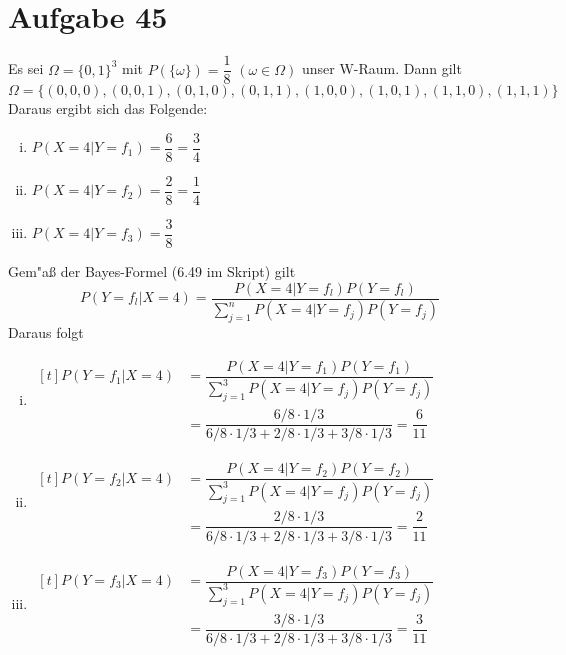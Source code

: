 \section{Aufgabe 45}

Es sei $\Omega = \{0, 1\}^3$ mit $P(\{\omega\}) = \dfrac{1}{8}$ $(\omega \in \Omega)$ unser W-Raum. Dann gilt
\begin{equation*}
    \Omega = \{(0, 0, 0), (0, 0, 1), (0, 1, 0), (0, 1, 1), (1, 0, 0), (1, 0, 1), (1, 1, 0), (1, 1, 1)\}
\end{equation*}
Daraus ergibt sich das Folgende:
\begin{enumerate}[i)]
    \item $P(X = 4 | Y = f_1) = \dfrac{6}{8} = \dfrac{3}{4}$
    \item $P(X = 4 | Y = f_2) = \dfrac{2}{8} = \dfrac{1}{4}$
    \item $P(X = 4 | Y = f_3) = \dfrac{3}{8}$
\end{enumerate}
Gem"a{\ss} der Bayes-Formel (6.49 im Skript) gilt
\begin{equation*}
    P(Y = f_l | X = 4) = \dfrac{P(X = 4 | Y = f_l)P(Y = f_l)}{\sum_{j = 1}^nP(X = 4 | Y = f_j)P(Y = f_j)}
\end{equation*}
Daraus folgt
\begin{enumerate}[i)]
    \item $\begin{aligned}[t]
            P(Y = f_1 | X = 4) &= \dfrac{P(X = 4 | Y = f_1)P(Y = f_1)}{\sum_{j = 1}^3P(X = 4 | Y = f_j)P(Y = f_j)}  \\[5pt]
                               &= \dfrac{6/8 \cdot 1/3}{6/8 \cdot 1/3 + 2/8 \cdot 1/3 + 3/8 \cdot 1/3} = \dfrac{6}{11}
        \end{aligned}$ \\[5pt]
    \item $\begin{aligned}[t]
            P(Y = f_2 | X = 4) &= \dfrac{P(X = 4 | Y = f_2)P(Y = f_2)}{\sum_{j = 1}^3P(X = 4 | Y = f_j)P(Y = f_j)}  \\[5pt]
                               &= \dfrac{2/8 \cdot 1/3}{6/8 \cdot 1/3 + 2/8 \cdot 1/3 + 3/8 \cdot 1/3} = \dfrac{2}{11}
        \end{aligned}$ \\[5pt]
    \item $\begin{aligned}[t]
            P(Y = f_3 | X = 4) &= \dfrac{P(X = 4 | Y = f_3)P(Y = f_3)}{\sum_{j = 1}^3P(X = 4 | Y = f_j)P(Y = f_j)}  \\[5pt]
                               &= \dfrac{3/8 \cdot 1/3}{6/8 \cdot 1/3 + 2/8 \cdot 1/3 + 3/8 \cdot 1/3} = \dfrac{3}{11}
        \end{aligned}$
\end{enumerate}
